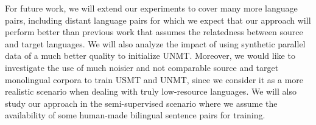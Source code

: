 \documentclass[11pt,a4paper]{article}
\begin{document}
For future work, we will extend our experiments to cover many more language pairs, including distant language pairs for which we expect that our approach will perform better than previous work that assumes the relatedness between source and target languages. We will also analyze the impact of using synthetic parallel data of a much better quality to initialize UNMT. Moreover, we would like to investigate the use of much noisier and not comparable source and target monolingual corpora to train USMT and UNMT, since we consider it as a more realistic scenario when dealing with truly low-resource languages. We will also study our approach in the semi-supervised scenario where we assume the availability of some human-made bilingual sentence pairs for training.
 


\end{document}
